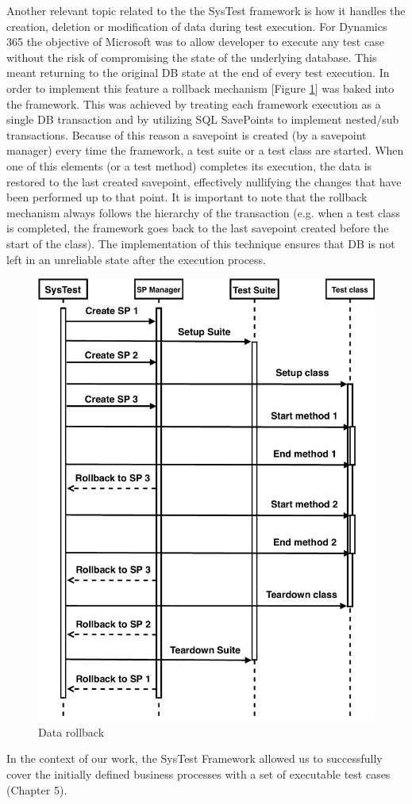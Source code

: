 Another relevant topic related to the the SysTest framework is how it handles the creation, deletion or modification of data during test execution. For Dynamics 365 the objective of Microsoft was to allow developer to execute any test case without the risk of compromising the state of the underlying database. This meant returning to the original DB state at the end of every test execution. In order to implement this feature a rollback mechanism [Figure \ref{fig:SysTestRollback}] was baked into the framework. This was achieved by treating each framework execution as a single DB transaction and by utilizing SQL SavePoints to implement nested/sub transactions. Because of this reason a savepoint is created (by a savepoint manager) every time the framework, a test suite or a test class are started. When one of this elements (or a test method) completes its execution, the data is restored to the last created savepoint, effectively nullifying the changes that have been performed up to that point. It is important to note that the rollback mechanism always follows the hierarchy of the transaction (e.g. when a test class is completed, the framework goes back to the last savepoint created before the start of the class). The implementation of this technique ensures that DB is not left in an unreliable state after the execution process.

\begin{figure}[ht]
	\centering
	\includegraphics[scale=0.7]{Images/SysTestRollback.pdf}
	\caption{Data rollback }
	\label{fig:SysTestRollback}
\end{figure}

In the context of our work, the SysTest Framework allowed us to successfully cover the initially defined business processes with a set of executable test cases (Chapter 5).
